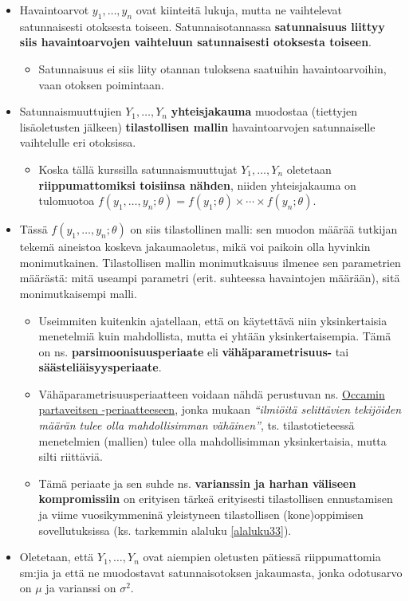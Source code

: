 \documentclass[
]{book}
\providecommand{\tightlist}{%
  \setlength{\itemsep}{0pt}\setlength{\parskip}{0pt}}
\begin{document}
\begin{itemize}
\tightlist
\item
  Havaintoarvot \(y_1, \dots, y_n\) ovat kiinteitä lukuja, mutta ne vaihtelevat satunnaisesti otoksesta toiseen. Satunnaisotannassa \textbf{satunnaisuus liittyy siis havaintoarvojen vaihteluun satunnaisesti otoksesta toiseen}.

  \begin{itemize}
  \tightlist
  \item
    Satunnaisuus ei siis liity otannan tuloksena saatuihin havaintoarvoihin, vaan otoksen poimintaan.
  \end{itemize}
\item
  Satunnaismuuttujien \(Y_1, \ldots, Y_n\) \textbf{yhteisjakauma} muodostaa (tiettyjen lisäoletusten jälkeen) \textbf{tilastollisen mallin} havaintoarvojen satunnaiselle vaihtelulle eri otoksissa.

  \begin{itemize}
  \tightlist
  \item
    Koska tällä kurssilla satunnaismuuttujat \(Y_1, \ldots, Y_n\) oletetaan \textbf{riippumattomiksi toisiinsa nähden}, niiden yhteisjakauma on tulomuotoa \(f(y_1, \ldots, y_n; \theta) = f(y_1; \theta) \times \cdots \times f(y_n; \theta)\).
  \end{itemize}
\item
  Tässä \(f(y_1, \ldots, y_n; \theta)\) on siis tilastollinen malli: sen muodon määrää tutkijan tekemä aineistoa koskeva jakaumaoletus, mikä voi paikoin olla hyvinkin monimutkainen. Tilastollisen mallin monimutkaisuus ilmenee sen parametrien määrästä: mitä useampi parametri (erit. suhteessa havaintojen määrään), sitä monimutkaisempi malli.

  \begin{itemize}
  \tightlist
  \item
    Useimmiten kuitenkin ajatellaan, että on käytettävä niin yksinkertaisia menetelmiä kuin mahdollista, mutta ei yhtään yksinkertaisempia. Tämä on ns. \textbf{parsimoonisuusperiaate} eli \textbf{vähäparametrisuus-} tai \textbf{säästeliäisyysperiaate}.
  \item
    Vähäparametrisuusperiaatteen voidaan nähdä perustuvan ns. \href{https://fi.wikipedia.org/wiki/Occamin_partaveitsi}{Occamin partaveitsen -periaatteeseen}, jonka mukaan \emph{``ilmiöitä selittävien tekijöiden määrän tulee olla mahdollisimman vähäinen''}, ts. tilastotieteessä menetelmien (mallien) tulee olla mahdollisimman yksinkertaisia, mutta silti riittäviä.
  \item
    Tämä periaate ja sen suhde ns. \textbf{varianssin ja harhan väliseen kompromissiin} on erityisen tärkeä erityisesti tilastollisen ennustamisen ja viime vuosikymmeninä yleistyneen tilastollisen (kone)oppimisen sovellutuksissa (ks. tarkemmin alaluku \ref{alaluku33}).
  \end{itemize}
\item
  Oletetaan, että \(Y_1, \ldots, Y_n\) ovat aiempien oletusten pätiessä riippumattomia sm:jia ja että ne muodostavat satunnaisotoksen jakaumasta, jonka odotusarvo on \(\mu\) ja varianssi on \(\sigma^2\).


\end{itemize}
\end{document}
